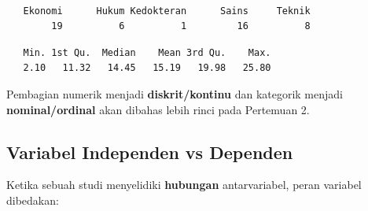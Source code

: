 \documentclass[
  indonesian,
  letterpaper,
]{book}
\newenvironment{Shaded}{\begin{snugshade}}{\end{snugshade}}
\newcommand{\FunctionTok}[1]{\textcolor[rgb]{0.28,0.35,0.67}{#1}}
\newcommand{\NormalTok}[1]{\textcolor[rgb]{0.00,0.23,0.31}{#1}}
\newcommand{\SpecialCharTok}[1]{\textcolor[rgb]{0.37,0.37,0.37}{#1}}
\begin{document}
\begin{Shaded}
\end{Shaded}

\begin{verbatim}

   Ekonomi      Hukum Kedokteran      Sains     Teknik 
        19          6          1         16          8 
\end{verbatim}

\begin{Shaded}
\end{Shaded}

\begin{verbatim}
   Min. 1st Qu.  Median    Mean 3rd Qu.    Max. 
   2.10   11.32   14.45   15.19   19.98   25.80 
\end{verbatim}

Pembagian numerik menjadi \textbf{diskrit/kontinu} dan kategorik menjadi
\textbf{nominal/ordinal} akan dibahas lebih rinci pada Pertemuan 2.

\subsection{Variabel Independen vs
Dependen}\label{variabel-independen-vs-dependen}

Ketika sebuah studi menyelidiki \textbf{hubungan} antarvariabel, peran
variabel dibedakan:
\end{document}
